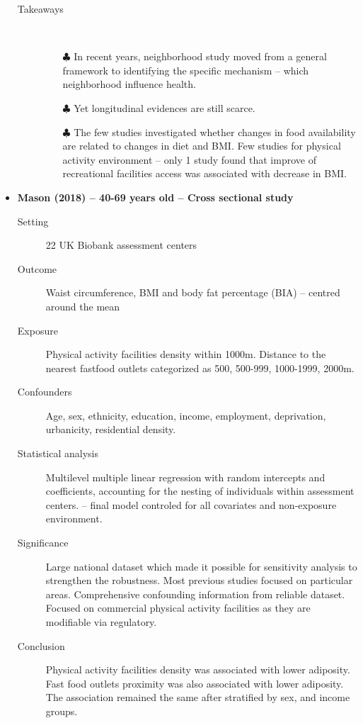 \documentclass{article}
\begin{document}
\begin{itemize}
\begin{description}
    			\item[Takeaways] \mbox{}\\ 
    				\begin{itemize}
    					\item[$\clubsuit$] In recent years, neighborhood study moved from a general framework to identifying the specific mechanism -- which neighborhood influence health.
    					\item[$\clubsuit$] Yet longitudinal evidences are still scarce.
    					\item[$\clubsuit$] The few studies investigated whether changes in food availability are related to changes in diet and BMI. Few studies for physical activity environment -- only 1 study found that improve of recreational facilities access was associated with decrease in BMI. 
				\end{itemize}
    		\end{description}

	\vspace{5mm}
	\item {\bf Mason (2018) -- 40-69 years old -- Cross sectional study}
		\begin{description}
			\item[Setting] 22 UK Biobank assessment centers
			\item[Outcome] Waist circumference, BMI and body fat percentage (BIA) -- centred around the mean  	
			\item[Exposure] Physical activity facilities density within 1000m. Distance to the nearest fastfood outlets categorized as 500, 500-999, 1000-1999, 2000m.
			\item[Confounders] Age, sex, ethnicity, education, income, employment, deprivation, urbanicity, residential density.
			\item[Statistical analysis] Multilevel multiple linear regression with random intercepts and coefficients, accounting for the nesting of individuals within assessment centers. -- final model controled for all covariates and non-exposure environment.
			\item[Significance] Large national dataset which 
			made it possible for sensitivity analysis to strengthen the robustness. Most previous studies focused on particular areas. Comprehensive confounding information from reliable dataset. Focused on commercial physical activity facilities as they are modifiable via regulatory.
    			\item[Conclusion] Physical activity facilities density was associated with lower adiposity. Fast food outlets proximity was also associated with lower adiposity. The association remained the same after stratified by sex, and income groups.
    			

\end{description}
\end{itemize}
\end{document}
